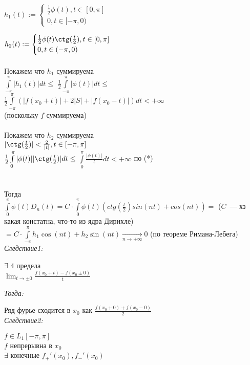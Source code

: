 \documentclass[paper=a4, fontsize=14pt]{report}
\begin{document}
$ h_1(t) := 
    \begin{cases}
        \frac{1}{2} \phi(t), t \in [0, \pi] \\
        0, t \in [-\pi,0)
    \end{cases}
$

$ h_2(t) := 
    \begin{cases}
        \frac{1}{2} \phi(t) \ctg(\frac{t}{2}), t \in [0, \pi] \\
        0, t \in (-\pi,0)
    \end{cases}
$
\\\\
Покажем что $ h_1 $ суммируема \\
$ \int\limits_{-\pi}^{\pi} |h_1(t)| dt \leq $
$ \frac{1}{2} \int\limits_{-\pi}^{\pi} |\phi(t)| dt \leq $
$ \frac{1}{2} \int\limits_{-\pi}^{\pi} (|f(x_0 + t)| + 2|S| + |f(x_0 - t)|) dt < +\infty $\\
(поскольку $f$ суммируема)
\\\\
Покажем что $ h_2 $ суммируема \\
$ |\ctg(\frac{t}{2})| < \frac{2}{|t|}, t \in [-\pi, \pi] $\\
$ \frac{1}{2} \int\limits_{0}^{\pi} |\phi(t)| |\ctg(\frac{t}{2})| dt \leq $
$ \int\limits_{0}^{\pi} \frac{|\phi(t)|}{t} dt < +\infty $ по (*)\\
\\\\
Тогда \\
$ \int\limits_0^\pi \phi(t)D_n(t) = C \cdot \int\limits_0^\pi \phi(t)(ctg(\frac{t}{2}) sin(nt) + cos(nt)) =$ ($C$~--- хз какая констатна, что-то из ядра Дирихле)\\
$= C \cdot \int\limits_{-\pi}^\pi h_1\cos(nt) + h_2\sin(nt) \xrightarrow[n \to +\infty]{} 0 $ (по теореме Римана-Лебега)\\

\emph{Следствие1:}

$ \exists $ 4 предела\\
$ \lim_{t \to \pm 0} \frac{f(x_0 + t) - f(x_0 \pm 0)}{t} $

\emph{Тогда:}

Ряд фурье сходится в $ x_0 $ как $ \frac{f(x_0 + 0) + f(x_0 - 0)}{2} $\\

\emph{Следствие2:}

$ f \in L_1[-\pi, \pi] $\\
$ f $ непрерывна в  $ x_0 $\\
$ \exists $ конечные $ f_{+}'(x_0), f_{-}'(x_0) $
\end{document}
